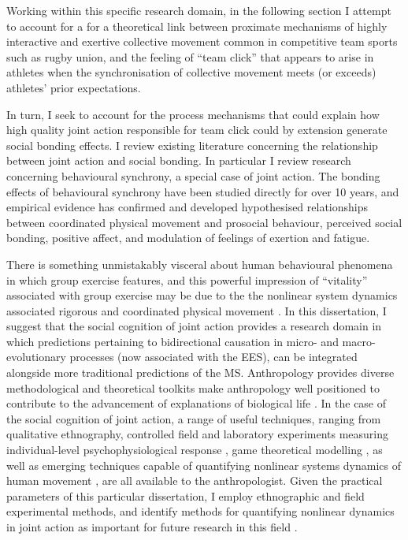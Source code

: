 Working within this specific research domain, in the following section I attempt to account for a for a theoretical link between proximate mechanisms of highly interactive and exertive collective movement common in competitive team sports such as rugby union, and the feeling of ``team click'' that appears to arise in athletes when the synchronisation of collective movement meets (or exceeds) athletes' prior expectations.

In turn, I seek to account for the process mechanisms that could explain how high quality joint action responsible for team click could by extension generate social bonding effects.  I review existing literature concerning the relationship between joint action and social bonding. In particular I review research concerning behavioural synchrony, a special case of joint action. The bonding effects of behavioural synchrony have been studied directly for over 10 years, and empirical evidence has confirmed and developed hypothesised relationships between coordinated physical movement and prosocial behaviour, perceived social bonding, positive affect, and modulation of feelings of exertion and fatigue.


There is something unmistakably visceral about human behavioural phenomena in which group exercise features, and this powerful impression of ``vitality'' associated with group exercise may be due to the the nonlinear system dynamics associated rigorous and coordinated physical movement \citep{Kelso2016}.  In this dissertation, I suggest that the social cognition of joint action provides a research domain in which predictions pertaining to bidirectional causation in micro- and macro- evolutionary processes (now associated with the EES), can be integrated alongside more traditional predictions of the MS.  Anthropology provides diverse methodological and theoretical toolkits make anthropology well positioned to contribute to the advancement of explanations of biological life \citep{Cohen2010a,Fuentes2016a}.  In the case of the social cognition of joint action, a range of useful techniques, ranging from qualitative ethnography, controlled field and laboratory experiments measuring individual-level psychophysiological response \citep{Cohen2010a}, game theoretical modelling \citep{Turchin2013,Nowak2017}, as well as emerging techniques capable of quantifying nonlinear systems dynamics of human movement \citep{Kelso2009}, are all available to the anthropologist.  Given the practical parameters of this particular dissertation, I employ ethnographic and field experimental methods, and identify methods for quantifying nonlinear dynamics in joint action as important for future research in this field \citep{Richardson2008,Marsh2009}.




















